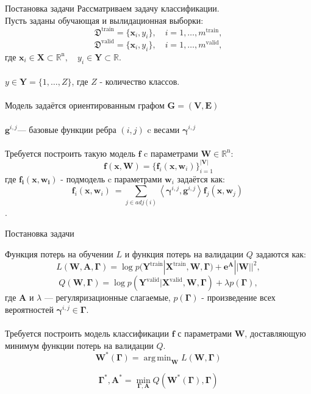 \documentclass[10pt]{beamer}
\DeclareMathOperator*{\argmin}{arg\,min}
\begin{document}
\begin{frame}{Постановка задачи}
Рассматриваем задачу классификации.\\
Пусть заданы обучающая и вылидационная выборки:
\[
\mathfrak{D}^{\text{train}} = \{\mathbf{x}_i, y_i\}, \quad i=1,\dots,m^{\text{train}},
\]
\[
\mathfrak{D}^{\text{valid}} = \{\mathbf{x}_i, y_i\}, \quad i=1,\dots,m^{\text{valid}},
\]
 где $\mathbf{x}_i\in\mathbf{X}\subset\mathbb{R}^{\text{n}},\quad y_i\in\mathbf{Y}\subset\mathbb{R}.$\\
~\\
$y\in\mathbf{Y}= \{1,\dots,Z\}$, где $Z$ - количество классов.\\
~\\
Модель задаётся ориентированным графом $\mathbf{G=(V,E)}$\\
~\\
$\mathbf{g}^{i,j} $--- базовые функции ребра $(i, j) $ c весами $\boldsymbol{\gamma}^{i,j}$\\
~\\
Требуется построить такую модель $\mathbf{f}$ c параметрами $\mathbf{W}\in\mathbb{R}^\text{n}$:
\[
\mathbf{f}(\mathbf{x}, \mathbf{W})= \{ \mathbf{f}_i(\mathbf{x}, \mathbf{w}_i)\}_{i=1}^\mathbf{|V|}
\]
где $\mathbf{f_i(x, w_i)}$ - подмодель c параметрами $\mathbf{w}_i$ задаётся как:
\[
\mathbf{f}_i(\mathbf{x}, \mathbf{w}_i)\ = \sum_{j\in adj(i)} \left\langle {\boldsymbol{\gamma}^{i,j}, \mathbf{g}^{i,j}} \right\rangle \mathbf{f}_j(\mathbf{x}, \mathbf{w}_j)\
\].


\end{frame}


\begin{frame}{Постановка задачи}

Функция потерь на обучении $L$ и функция потерь на валидации $Q$ задаются как:
\[
L (\mathbf{W}, \mathbf{A}, \boldsymbol{\Gamma})= \log p(\mathbf{Y}^\text{train}|\mathbf{X}^\text{train}, \mathbf{W}, \boldsymbol{\Gamma}) + \boldsymbol{e}^{\mathbf{A}}||\mathbf{W}||^2,
\]
\[
Q (\mathbf{W}, \boldsymbol{\Gamma})= \log p(\mathbf{Y}^\text{valid}|\mathbf{X}^\text{valid}, \mathbf{W}, \boldsymbol{\Gamma}) + \lambda p(\boldsymbol{\Gamma}),
\]
где $\mathbf{A}$ и $\lambda$ --- регуляризационные слагаемые, $p(\boldsymbol{\Gamma})$ - произведение всех вероятностей $\boldsymbol{\gamma}^{i,j} \in \boldsymbol{\Gamma}$. \\
~\\
Требуется построить модель классификации $\mathbf{f}$ с параметрами $\mathbf{W}$, доставляющую минимум функции потерь на валидации $Q$.
\[
\mathbf{W}^*( \boldsymbol{\Gamma}) = \argmin_{\mathbf{W}}
L (\mathbf{W}, \boldsymbol{\Gamma})\]

\[
\boldsymbol{\Gamma}^*, \mathbf{A}^* = \min_{\boldsymbol{\Gamma}, \mathbf{A}} Q (\mathbf{W}^*( \boldsymbol{\Gamma}), \boldsymbol{\Gamma})
\]



\end{frame}
\end{document}

